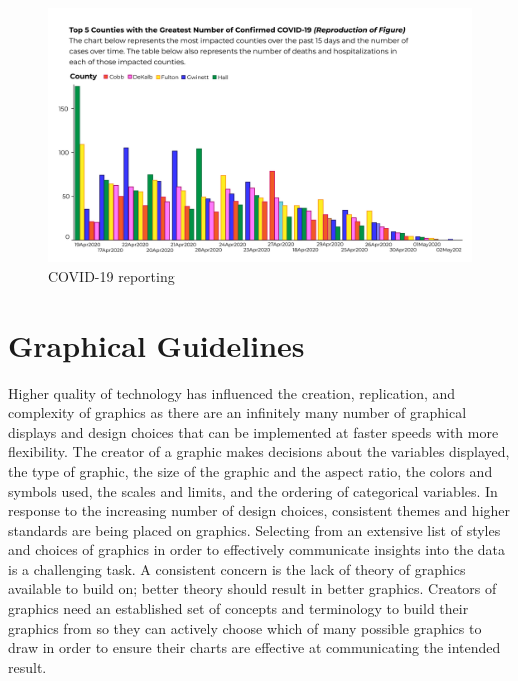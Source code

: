 \documentclass[print]{nuthesis}
\begin{document}
\begin{figure}[tbp]

{\centering \includegraphics[width=0.85\linewidth,]{images/covid-ga-recreation} 

}

\caption{COVID-19 reporting}\label{fig:covid-19-reporting}
\end{figure}


\hypertarget{graphical-guidelines}{%
\section{Graphical Guidelines}\label{graphical-guidelines}}

Higher quality of technology has influenced the creation, replication, and complexity of graphics as there are an infinitely many number of graphical displays and design choices that can be implemented at faster speeds with more flexibility.
The creator of a graphic makes decisions about the variables displayed, the type of graphic, the size of the graphic and the aspect ratio, the colors and symbols used, the scales and limits, and the ordering of categorical variables.
In response to the increasing number of design choices, consistent themes and higher standards are being placed on graphics.
Selecting from an extensive list of styles and choices of graphics in order to effectively communicate insights into the data is a challenging task.
A consistent concern is the lack of theory of graphics available to build on; better theory should result in better graphics.
Creators of graphics need an established set of concepts and terminology to build their graphics from so they can actively choose which of many possible graphics to draw in order to ensure their charts are effective at communicating the intended result.
\end{document}
